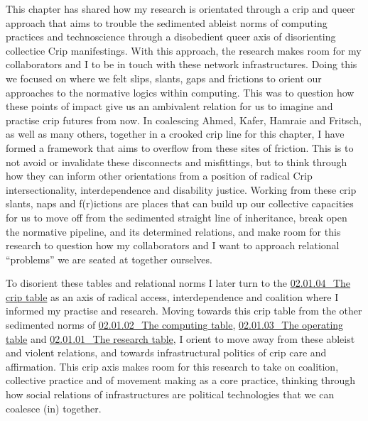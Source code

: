 This chapter has shared how my research is orientated through a crip and
queer approach that aims to trouble the sedimented ableist norms of
computing practices and technoscience through a disobedient queer axis
of disorienting collectice Crip manifestings. With this approach, the
research makes room for my collaborators and I to be in touch with these
network infrastructures. Doing this we focused on where we felt slips,
slants, gaps and frictions to orient our approaches to the normative
logics within computing. This was to question how these points of impact
give us an ambivalent relation for us to imagine and practise crip
futures from now. In coalescing Ahmed, Kafer, Hamraie and Fritsch, as
well as many others, together in a crooked crip line for this chapter, I
have formed a framework that aims to overflow from these sites of
friction. This is to not avoid or invalidate these disconnects and
misfittings, but to think through how they can inform other orientations
from a position of radical Crip intersectionality, interdependence and
disability justice. Working from these crip slants, naps and f(r)ictions
are places that can build up our collective capacities for us to move
off from the sedimented straight line of inheritance, break open the
normative pipeline, and its determined relations, and make room for this
research to question how my collaborators and I want to approach
relational ``problems'' we are seated at together ourselves.

To disorient these tables and relational norms I later turn to the
\href{../02_Crip-Tic\%20of\%20vignettes/02.01.04_The\%20crip\%20table.md}{02.01.04\_The
crip table} as an axis of radical access, interdependence and coalition
where I informed my practise and research. Moving towards this crip
table from the other sedimented norms of
\href{../02_Crip-Tic\%20of\%20vignettes/02.01.02_The\%20computing\%20table.md}{02.01.02\_The
computing table},
\href{../02_Crip-Tic\%20of\%20vignettes/02.01.03_The\%20operating\%20table.md}{02.01.03\_The
operating table} and
\href{../02_Crip-Tic\%20of\%20vignettes/02.01.01_The\%20research\%20table.md}{02.01.01\_The
research table}, I orient to move away from these ableist and violent
relations, and towards infrastructural politics of crip care and
affirmation. This crip axis makes room for this research to take on
coalition, collective practice and of movement making as a core
practice, thinking through how social relations of infrastructures are
political technologies that we can coalesce (in) together.

